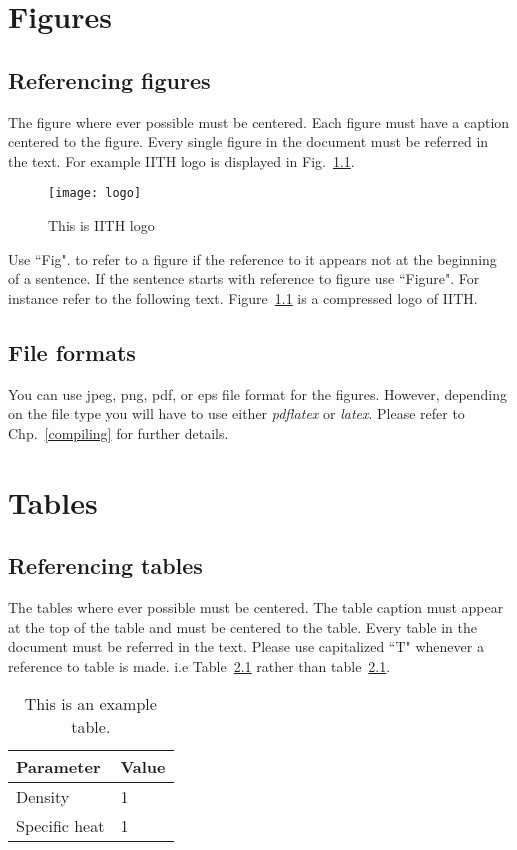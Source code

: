 \documentclass[a4paper,twoside]{iiththesis}
\begin{document}
\chapter{Figures}
\section{Referencing figures}
The figure where ever possible must be centered. Each figure must have a caption centered to the figure. Every single figure in the document must be referred in the text. For example IITH logo is displayed in Fig.~\ref{iithlogo}.

\begin{figure}[h]
\centering
\texttt{[image: logo]}
\caption{This is IITH logo}
\label{iithlogo}
\end{figure}

Use ``Fig". to refer to a figure if the reference to it appears not at the beginning of a sentence. If the sentence starts with reference to figure use ``Figure". For instance refer to the following text.
Figure~\ref{iithlogo} is a compressed logo of IITH.\\

\section{File formats}
You can use jpeg, png, pdf, or eps file format for the figures. However, depending on the file type you will have to use either \textit{pdflatex} or \textit{latex}. Please refer to Chp.~\ref{compiling} for further details.


\chapter{Tables}

\section{Referencing tables}
The tables where ever possible must be centered. The table caption must appear at the top of the table and must be centered to the table. Every table in the document must be referred in the text. Please use capitalized ``T" whenever a reference to table is made. i.e Table~\ref{extable} rather than table~\ref{extable}.
\begin{table}[h]
\centering
\caption{This is an example table.}
\begin{tabular}{l l}
\hline
Parameter & Value \\
\hline
Density & 1 \\
Specific heat & 1 \\
\hline
\end{tabular}
\label{extable}
\end{table}
\end{document}

